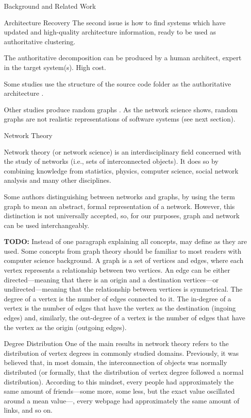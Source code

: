 \documentclass[11pt,twocolumn,a4paper,english]{article}
\newcommand{\TODO}{\textbf{TODO:} }
\begin{document}
\begin{section}{Background and Related Work}
\begin{subsection}{Architecture Recovery}
	The second issue is how to find systems which have updated and high-quality architecture information, ready to be used as authoritative clustering.
	
	The authoritative decomposition can be produced by a human architect, expert in the target system(s). High cost.
	
	Some studies use the structure of the source code folder as the authoritative architecture \cite{Bittencourt2009,Wu2005}.
	
	Other studies produce random graphs \cite{Mitchell2007}. As the network science shows, random graphs are not realistic representations of software systems (see next section).
	
\end{subsection}

\begin{subsection}{Network Theory}
	
	Network theory (or network science) is an interdisciplinary field	concerned with the study of networks (i.e., sets of interconnected objects). It does so by combining knowledge from statistics, physics, computer science, social network analysis and many other disciplines.

	Some authors distinguishing between networks and graphs, by using the term graph to mean an abstract, formal representation of a network. However, this distinction is not universally accepted, so, for our purposes, graph and network can be used interchangeably.

	\TODO Instead of one paragraph explaining all concepts, may define as they are used.
	Some concepts from graph theory should be familiar to most readers with computer science background. A graph is a set of vertices and edges, where each vertex represents a relationship between two vertices. An edge can be either directed---meaning that there is an origin and a destination vertices---or undirected---meaning that the relationship between vertices is symmetrical. The degree of a vertex is the number of edges connected to it. The in-degree of a vertex is the number of edges that have the vertex as the destination (ingoing edges) and, similarly, the out-degree of a vertex is the number of edges that have the vertex as the origin (outgoing edges).

\begin{subsubsection}{Degree Distribution}
	One of the main results in network theory refers to the distribution of vertex degrees in commonly studied domains. Previously, it was believed that, in most domain, the interconnection of objects was normally distributed (or formally, that the distribution of vertex degree followed a normal distribution). According to this mindset, every people had approximately the same amount of friends---some more, some less, but the exact value oscillated around a mean value---, every webpage had approximately the same amount of links, and so on. 
	

\end{subsubsection}
\end{subsection}
\end{section}
\end{document}
